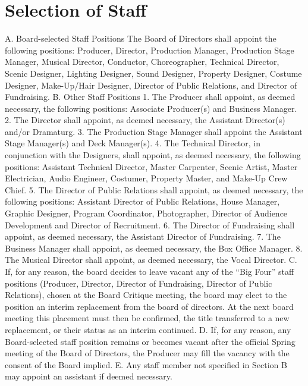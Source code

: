 \documentclass{article}
\begin{document}
\section{Selection of Staff}
A.	Board-selected Staff Positions
The Board of Directors shall appoint the following positions: Producer, Director, Production Manager, Production Stage Manager, Musical Director, Conductor, Choreographer, Technical Director, Scenic Designer, Lighting Designer, Sound Designer, Property Designer, Costume Designer, Make-Up/Hair Designer, Director of Public Relations, and Director of Fundraising.
B.	Other Staff Positions
1.	The Producer shall appoint, as deemed necessary, the following positions: Associate Producer(s) and Business Manager.
2.	The Director shall appoint, as deemed necessary, the Assistant Director(s) and/or Dramaturg.
3.	The Production Stage Manager shall appoint the Assistant Stage Manager(s) and Deck Manager(s).
4.	The Technical Director, in conjunction with the Designers, shall appoint, as deemed necessary, the following positions: Assistant Technical Director, Master Carpenter, Scenic Artist, Master Electrician, Audio Engineer, Costumer, Property Master, and Make-Up Crew Chief.
5.	The Director of Public Relations shall appoint, as deemed necessary, the following positions: Assistant Director of Public Relations, House Manager, Graphic Designer, Program Coordinator, Photographer, Director of Audience Development and Director of Recruitment.
6.	The Director of Fundraising shall appoint, as deemed necessary, the Assistant Director of Fundraising.
7. The Business Manager shall appoint, as deemed necessary, the Box Office Manager.
8. The Musical Director shall appoint, as deemed necessary, the Vocal Director.
C.	If, for any reason, the board decides to leave vacant any of the “Big Four” staff positions (Producer, Director, Director of Fundraising, Director of Public Relations), chosen at the Board Critique meeting, the board may elect to the position an interim replacement from the board of directors.  At the next board meeting this placement must then be confirmed, the title transferred to a new replacement, or their status as an interim continued.     
D.	If, for any reason, any Board-selected staff position remains or becomes vacant after the official Spring meeting of the Board of Directors, the Producer may fill the vacancy with the consent of the Board implied.
E.	Any staff member not specified in Section B may appoint an assistant if deemed necessary.
\end{document}
